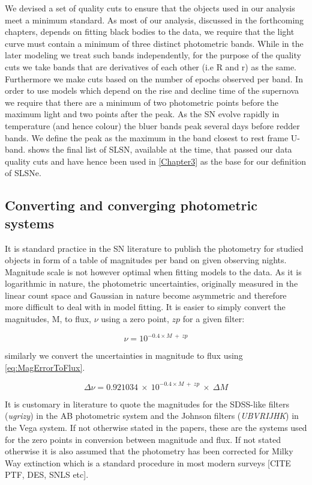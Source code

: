 We devised a set of quality cuts to ensure that the objects used in our analysis meet a minimum standard. As most of our analysis, discussed in the forthcoming chapters, depends on fitting black bodies to the data, we require that the light curve must contain a minimum of three distinct photometric bands. While in the later modeling we treat such bands independently, for the purpose of the quality cuts we take bands that are derivatives of each other (i.e R and r) as the same. Furthermore we make cuts based on the number of epochs observed per band. In order to use models which depend on the rise and decline time of the supernova we require that there are a minimum of two photometric points before the maximum light and two points after the peak. As the SN evolve rapidly in temperature (and hence colour) the bluer bands peak several days before redder bands. We define the peak as the maximum in the band closest to rest frame U-band.  shows the final list of SLSN, available at the time, that passed our data quality cuts and have hence been used in \cref{Chapter3} as the base for our definition of SLSNe.

\subsection{Converting and converging photometric systems}
It is standard practice in the SN literature to publish the photometry for studied objects in form of a table of magnitudes per band on given observing nights. Magnitude scale is not however optimal when fitting models to the data. As it is logarithmic in nature, the photometric uncertainties, originally measured in the linear count space and Gaussian in nature become asymmetric and therefore more difficult to deal with in model fitting. It is easier to simply convert the magnitudes, M, to flux, $\nu$ using a zero point, $zp$ for a given filter:

\begin{equation}
\label{eq:MagToFlux}
\nu = 10^{-0.4 \times M~+~zp}
\end{equation}

similarly we convert the uncertainties in magnitude to flux using \eqref{eq:MagErrorToFlux}.

\begin{equation}
\label{eq:MagErrorToFlux}
\Delta \nu = 0.921034~\times~10^{-0.4 \times M~+~zp}~\times~\Delta M
\end{equation}

It is customary in literature to quote the magnitudes for the SDSS-like filters (\textit{ugrizy}) in the AB photometric system and the Johnson filters (\textit{UBVRIJHK}) in the Vega system. If not otherwise stated in the papers, these are the systems used for the zero points in conversion between magnitude and flux. If not stated otherwise it is also assumed that the photometry has been corrected for Milky Way extinction which is a standard procedure in most modern surveys [CITE PTF, DES, SNLS etc].

